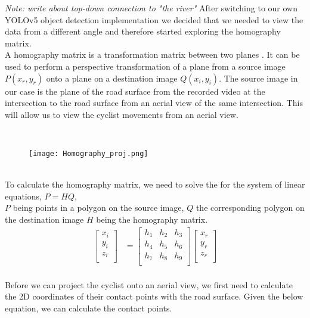 \textit{Note: write about top-down connection to "the river"}
After switching to our own YOLOv5 object detection implementation we decided that we needed to view the data from a different angle and therefore
started exploring the homography matrix.
\ \\
A homography matrix is a transformation matrix between two planes \cite{hartley_zisserman_2004}. It can be used to perform a perspective transformation of a plane from a source image $P(x_r, y_r)$ onto a plane on a destination image $Q(x_i, y_i)$.
The source image in our case is the plane of the road surface from the recorded video at the intersection to the road surface from an aerial view of the same intersection. 
This will allow us to view the cyclist movements from an aerial view.

\ \\ 
\begin{figure}[h]
  \texttt{[image: Homography\_proj.png]}
  \centering 
  \end{figure}
  \label{homography}
\ \\ 
To calculate the homography matrix, we need to solve the for the system of linear equations, $P = HQ$,
\ \\
$P$ being points in a polygon on the source image, $Q$ the corresponding polygon on the destination image $H$ being the homography matrix.
\begin{align}
\label{eq:3}
  \begin{bmatrix}
    x_{i} \\
    y_{i} \\
    z_{i} \\
  \end{bmatrix}
  &= \begin{bmatrix}
      h_1 & h_2 & h_3 \\
      h_4 & h_5 & h_6 \\
      h_7 & h_8 & h_9 \\
  \end{bmatrix}
  \begin{bmatrix}
    x_{r} \\
    y_{r} \\
    z_{r} \\
  \end{bmatrix}
\end{align}
\ \\

Before we can project the cyclist onto an aerial view, we first need to calculate the 2D coordinates of their contact points with the road surface.
Given the below equation, we can calculate the contact points.

